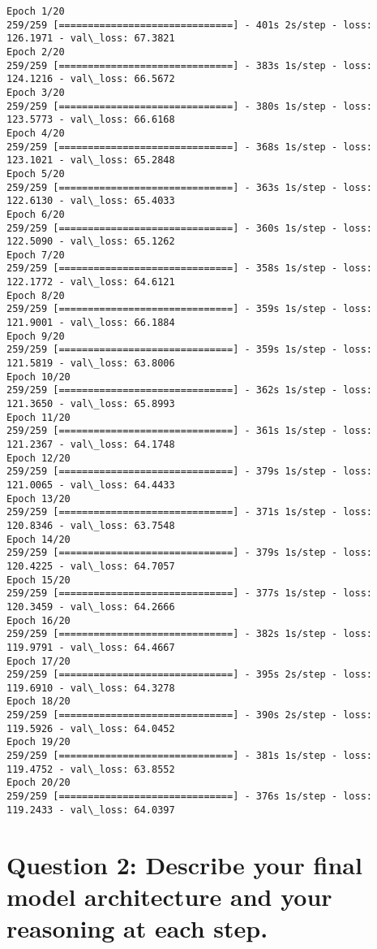 \documentclass[11pt]{article}
\begin{document}
    \begin{Verbatim}[commandchars=\\\{\}]
Epoch 1/20
259/259 [==============================] - 401s 2s/step - loss: 126.1971 - val\_loss: 67.3821
Epoch 2/20
259/259 [==============================] - 383s 1s/step - loss: 124.1216 - val\_loss: 66.5672
Epoch 3/20
259/259 [==============================] - 380s 1s/step - loss: 123.5773 - val\_loss: 66.6168
Epoch 4/20
259/259 [==============================] - 368s 1s/step - loss: 123.1021 - val\_loss: 65.2848
Epoch 5/20
259/259 [==============================] - 363s 1s/step - loss: 122.6130 - val\_loss: 65.4033
Epoch 6/20
259/259 [==============================] - 360s 1s/step - loss: 122.5090 - val\_loss: 65.1262
Epoch 7/20
259/259 [==============================] - 358s 1s/step - loss: 122.1772 - val\_loss: 64.6121
Epoch 8/20
259/259 [==============================] - 359s 1s/step - loss: 121.9001 - val\_loss: 66.1884
Epoch 9/20
259/259 [==============================] - 359s 1s/step - loss: 121.5819 - val\_loss: 63.8006
Epoch 10/20
259/259 [==============================] - 362s 1s/step - loss: 121.3650 - val\_loss: 65.8993
Epoch 11/20
259/259 [==============================] - 361s 1s/step - loss: 121.2367 - val\_loss: 64.1748
Epoch 12/20
259/259 [==============================] - 379s 1s/step - loss: 121.0065 - val\_loss: 64.4433
Epoch 13/20
259/259 [==============================] - 371s 1s/step - loss: 120.8346 - val\_loss: 63.7548
Epoch 14/20
259/259 [==============================] - 379s 1s/step - loss: 120.4225 - val\_loss: 64.7057
Epoch 15/20
259/259 [==============================] - 377s 1s/step - loss: 120.3459 - val\_loss: 64.2666
Epoch 16/20
259/259 [==============================] - 382s 1s/step - loss: 119.9791 - val\_loss: 64.4667
Epoch 17/20
259/259 [==============================] - 395s 2s/step - loss: 119.6910 - val\_loss: 64.3278
Epoch 18/20
259/259 [==============================] - 390s 2s/step - loss: 119.5926 - val\_loss: 64.0452
Epoch 19/20
259/259 [==============================] - 381s 1s/step - loss: 119.4752 - val\_loss: 63.8552
Epoch 20/20
259/259 [==============================] - 376s 1s/step - loss: 119.2433 - val\_loss: 64.0397

    \end{Verbatim}

    \section{\texorpdfstring{\textbf{Question 2:} Describe your final model
architecture and your reasoning at each
step.}{Question 2: Describe your final model architecture and your reasoning at each step.}}\label{question-2-describe-your-final-model-architecture-and-your-reasoning-at-each-step.}
\end{document}
